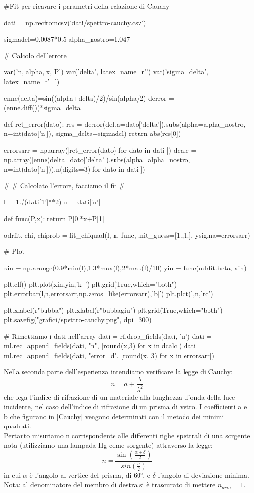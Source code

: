 \begin{sagesilent}
#Fit per ricavare i parametri della relazione di Cauchy

dati = np.recfromcsv('dati/spettro-cauchy.csv')

sigmadel=0.0087*0.5
alpha_nostro=1.047

# Calcolo dell'errore

var('n, alpha, x, P')
var('delta', latex_name=r'\delta')
var('sigma_delta', latex_name=r'\sigma_{\delta}')

enne(delta)=sin((alpha+delta)/2)/sin(alpha/2)
derror = (enne.diff())*sigma_delta

def ret_error(dato):
  res = derror(delta=dato['delta']).subs(alpha=alpha_nostro, n=int(dato['n']), sigma_delta=sigmadel)
  return abs(res[0])

errorsarr = np.array([ret_error(dato) for dato in dati ])
dcalc = np.array([enne(delta=dato['delta']).subs(alpha=alpha_nostro, n=int(dato['n'])).n(digits=3) for dato in dati ])

#
# Calcolato l'errore, facciamo il fit
#

l = 1./(dati['l']**2)
n = dati['n']

def func(P,x):
    return P[0]*x+P[1]

odrfit, chi, chiprob = fit_chiquad(l, n, func, init_guess=[1.,1.], ysigma=errorsarr)


# Plot

xin = np.arange(0.9*min(l),1.3*max(l),2*max(l)/10)
yin = func(odrfit.beta, xin)

plt.clf()
plt.plot(xin,yin,'k--')
plt.grid(True,which="both")
plt.errorbar(l,n,errorsarr,np.zeros_like(errorsarr),'b|')
plt.plot(l,n,'ro')

plt.xlabel(r"bubba")
plt.xlabel(r"bubbagiu")
plt.grid(True,which="both")
plt.savefig("grafici/spettro-cauchy.png", dpi=300)

# Rimettiamo i dati nell'array
dati = rf.drop_fields(dati, 'n')
dati = ml.rec_append_fields(dati, "n", [round(x,3) for x in dcalc])
dati = ml.rec_append_fields(dati, "error_d", [round(x, 3) for x in errorsarr])
\end{sagesilent}

Nella seconda parte dell'esperienza intendiamo verificare la legge di Cauchy:
\begin{equation}
n = a + \frac{b}{\lambda^2}
\label{Cauchy}
\end{equation}
che lega l'indice di rifrazione di un materiale alla lunghezza d'onda della luce incidente, nel caso dell'indice di rifrazione di un prisma di vetro.
I coefficienti a e b che figurano in \ref{Cauchy} vengono determinati con il metodo dei minimi quadrati. \\
Pertanto misuriamo n corrispondente alle differenti righe spettrali di una sorgente nota (utilizziamo una lampada Hg come sorgente) attraverso la legge:
\begin{equation}
n = \frac{\sin(\frac{\alpha + \delta}{2})}{sin(\frac{\alpha}{2})}
\label{n}
\end{equation}
in cui $\alpha$ è l'angolo al vertice del prisma, di $60°$, e $\delta$ l'angolo di deviazione minima. Nota: al denominatore del membro di destra si è trascurato di mettere $n_{aria}=1$.\\

